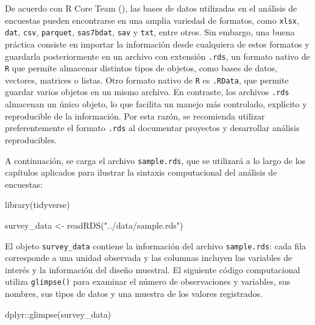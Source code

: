 \documentclass[
  spanish,
  11pt,
  letterpaper,
  oneside,
  open=any]{scrbook}
\newenvironment{Shaded}{\begin{snugshade}}{\end{snugshade}}
\newcommand{\FunctionTok}[1]{\textcolor[rgb]{0.28,0.35,0.67}{#1}}
\newcommand{\NormalTok}[1]{\textcolor[rgb]{0.00,0.23,0.31}{#1}}
\newcommand{\OtherTok}[1]{\textcolor[rgb]{0.00,0.23,0.31}{#1}}
\newcommand{\SpecialCharTok}[1]{\textcolor[rgb]{0.37,0.37,0.37}{#1}}
\newcommand{\StringTok}[1]{\textcolor[rgb]{0.13,0.47,0.30}{#1}}
\begin{document}
De acuerdo con R Core Team
(), las bases de datos
utilizadas en el análisis de encuestas pueden encontrarse en una amplia
variedad de formatos, como \texttt{xlsx}, \texttt{dat}, \texttt{csv},
\texttt{parquet}, \texttt{sas7bdat}, \texttt{sav} y \texttt{txt}, entre
otros. Sin embargo, una buena práctica consiste en importar la
información desde cualquiera de estos formatos y guardarla
posteriormente en un archivo con extensión \texttt{.rds}, un formato
nativo de \texttt{R} que permite almacenar distintos tipos de objetos,
como bases de datos, vectores, matrices o listas. Otro formato nativo de
\texttt{R} es \texttt{.RData}, que permite guardar varios objetos en un
mismo archivo. En contraste, los archivos \texttt{.rds} almacenan un
único objeto, lo que facilita un manejo más controlado, explícito y
reproducible de la información. Por esta razón, se recomienda utilizar
preferentemente el formato \texttt{.rds} al documentar proyectos y
desarrollar análisis reproducibles.

A continuación, se carga el archivo \texttt{sample.rds}, que se
utilizará a lo largo de los capítulos aplicados para ilustrar la
sintaxis computacional del análisis de encuestas:

\begin{Shaded}
\begin{Highlighting}[]
\FunctionTok{library}\NormalTok{(tidyverse)}

\NormalTok{survey\_data }\OtherTok{\textless{}{-}} \FunctionTok{readRDS}\NormalTok{(}\StringTok{"../data/sample.rds"}\NormalTok{)}
\end{Highlighting}
\end{Shaded}

El objeto \texttt{survey\_data} contiene la información del archivo
\texttt{sample.rds}: cada fila corresponde a una unidad observada y las
columnas incluyen las variables de interés y la información del diseño
muestral. El siguiente código computacional utiliza \texttt{glimpse()}
para examinar el número de observaciones y variables, sus nombres, sus
tipos de datos y una muestra de los valores registrados.

\begin{Shaded}
\begin{Highlighting}[]
\NormalTok{dplyr}\SpecialCharTok{::}\FunctionTok{glimpse}\NormalTok{(survey\_data)}
\end{Highlighting}
\end{Shaded}
\end{document}
